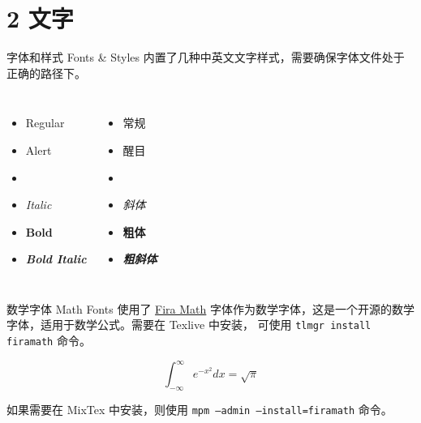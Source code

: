 \documentclass[10pt,aspectratio=169,fontset=none]{ctexbeamer}
\begin{document}
    \section{2 文字}

    \begin{frame}{字体和样式 Fonts \& Styles}
        内置了几种中英文文字样式，需要确保字体文件处于正确的路径下。
        \begin{columns}
            \begin{itemize}
                \item Regular
                \item \alert{Alert}
                \item {}
                \item \textit{Italic}
                \item \textbf{Bold}
                \item \textbf{\textit{Bold Italic}}
            \end{itemize}
            \begin{itemize}
                \item 常规
                \item \alert{醒目}
                \item {}
                \item \textit{斜体}
                \item \textbf{粗体}
                \item \textbf{\textit{粗斜体}}
            \end{itemize}
        \end{columns}
        
    \end{frame}

    \begin{frame}{数学字体 Math Fonts}
        使用了 \href{https://github.com/firamath/firamath}{Fira Math} 字体作为数学字体，这是一个开源的数学字体，适用于数学公式。需要在 Texlive 中安装， 可使用 \texttt{\alert{tlmgr} install firamath} 命令。

        \begin{equation}
            \int_{-\infty}^{\infty} e^{-x^2} dx = \sqrt{\pi}
        \end{equation}

        如果需要在 MixTex 中安装，则使用 \texttt{\alert{mpm} --admin --install=firamath} 命令。

    \end{frame}
\end{document}
